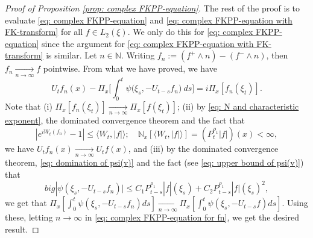 \documentclass[12pt,a4paper]{amsart}
\theoremstyle{plain}
\theoremstyle{definition}
\numberwithin{equation}{section}
\begin{document}
\begin{proof}[Proof of Proposition \ref{prop: complex FKPP-equation}]
The rest of the proof is to evaluate \eqref{eq: complex FKPP-equation} and \eqref{eq: complex FKPP-equation with FK-transform} for all $f\in L_2(\xi)$. We only do this for \eqref{eq: complex FKPP-equation} since the argument for \eqref{eq: complex FKPP-equation with FK-transform} is similar.
Let $n \in \mathbb N$.
Writing $f_n := (f^+ \wedge n) - (f^- \wedge n)$, then $f_n \xrightarrow[n\to \infty]{} f$ pointwise.
From what we have proved, we have
\begin{equation}
  \label{eq: complex FKPP-equation for fn}
  U_tf_n(x) - \Pi_{x} \Big[\int_0^t \psi\big(\xi_s, - U_{t-s}f_n\big) ~ds\Big]
  = i \Pi_{x} [f_n(\xi_t)].
\end{equation}
Note that 
(i) $\Pi_{x}[f_n(\xi_t)] \xrightarrow[n\to \infty]{} \Pi_{x}[f(\xi_t)]$;
(ii) by \eqref{eq: N and characteristic exponent}, the dominated convergence theorem and the fact that
\[
  |e^{i W_t(f_n)} - 1| \leq \langle W_t, |f|\rangle;
  \quad \mathbb N_x[\langle W_t, |f|\rangle] = (P_t^{\rho_1} |f|)(x) < \infty,
\]
we have $U_tf_n(x) \xrightarrow[n\to \infty]{} U_tf(x)$, and (iii) by the dominated convergence theorem, \eqref{eq: domination of psi(v)} and the fact (see \eqref{eq: upper bound of psi(v)}) that
\[
  big|\psi(\xi_s,- U_{t-s}f_n)\big|
  \leq C_1 P_{t-s}^{\rho_1}|f|(\xi_s)+C_2 P_{t-s}^{\rho_1}|f|(\xi_s)^2,
\]
we get that $\Pi_{x} [\int_0^t \psi(\xi_s,- U_{t-s}f_n)ds] \xrightarrow[n\to \infty]{} \Pi_{x} [\int_0^t \psi(\xi_s,- U_{t-s}f)ds]$.
Using these, letting $n \to \infty$ in \eqref{eq: complex FKPP-equation for fn}, we get the desired result.
\end{proof}
\end{document}

